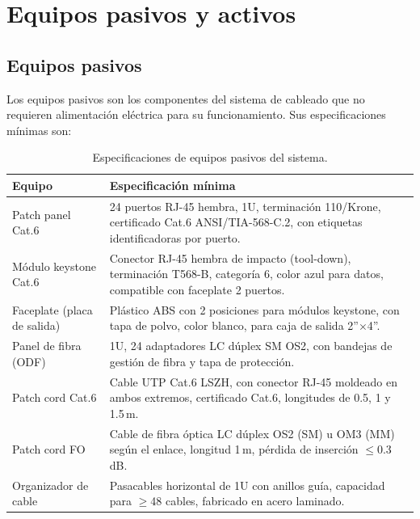 \section{Equipos pasivos y activos}
\label{sec:equipos}

\subsection{Equipos pasivos}

Los equipos pasivos son los componentes del sistema de cableado que no requieren
alimentación eléctrica para su funcionamiento. Sus especificaciones mínimas son:

\begin{table}[H]
    \centering
    \caption{Especificaciones de equipos pasivos del sistema.}
    \label{tab:pasivos}
    \begin{tabular}{|p{3.5cm}|p{10cm}|}
        \hline
        \textbf{Equipo} & \textbf{Especificación mínima} \\
        \hline
        Patch panel Cat.6 &
        24 puertos RJ-45 hembra, 1U, terminación 110/Krone,
        certificado Cat.6 ANSI/TIA-568-C.2, con etiquetas identificadoras
        por puerto. \\
        \hline
        Módulo keystone Cat.6 &
        Conector RJ-45 hembra de impacto (tool-down), terminación T568-B,
        categoría 6, color azul para datos, compatible con faceplate 2 puertos. \\
        \hline
        Faceplate (placa de salida) &
        Plástico ABS con 2 posiciones para módulos keystone, con tapa
        de polvo, color blanco, para caja de salida 2''$\times$4''. \\
        \hline
        Panel de fibra (ODF) &
        1U, 24 adaptadores LC dúplex SM OS2, con bandejas de gestión de
        fibra y tapa de protección. \\
        \hline
        Patch cord Cat.6 &
        Cable UTP Cat.6 LSZH, con conector RJ-45 moldeado en ambos extremos,
        certificado Cat.6, longitudes de 0.5, 1 y 1.5\,m. \\
        \hline
        Patch cord FO &
        Cable de fibra óptica LC dúplex OS2 (SM) u OM3 (MM) según el enlace,
        longitud 1\,m, pérdida de inserción $\leq$0.3\,dB. \\
        \hline
        Organizador de cable &
        Pasacables horizontal de 1U con anillos guía, capacidad para
        $\geq$48 cables, fabricado en acero laminado. \\
        \hline
    \end{tabular}
\end{table}%
\nobreak\vspace{-0.3cm}

